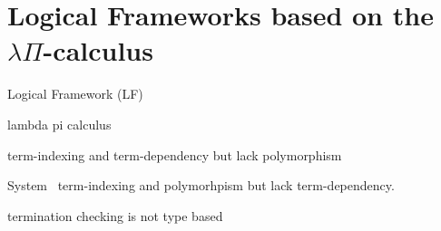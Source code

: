 \section{Logical Frameworks based on the $\lambda\Pi$-calculus}

Logical Framework (LF)

lambda pi calculus

term-indexing and term-dependency 
but lack polymorphism

System \Fi\
term-indexing and polymorhpism
but lack term-dependency.


termination checking is not type based


